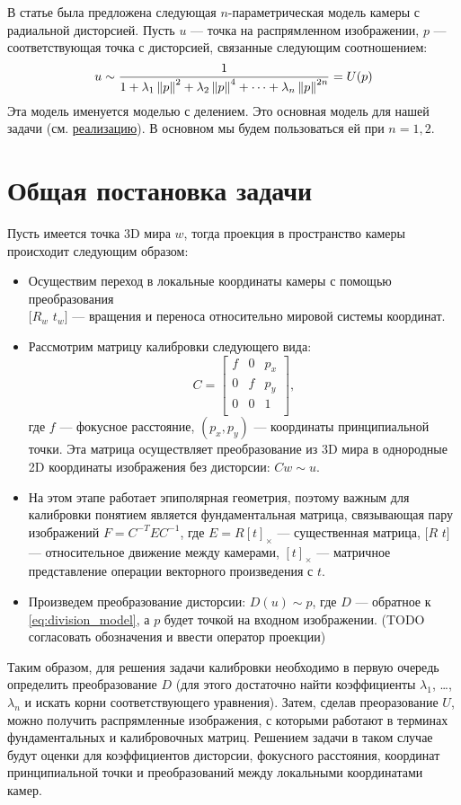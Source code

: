 \label{model}
В статье \cite{Fitzgibbon01b} была предложена следующая $n$-параметрическая модель камеры с радиальной дисторсией. Пусть $u$ --- точка на распрямленном изображении, $p$ --- соответствующая точка с дисторсией, связанные следующим соотношением:
\begin{equation}
	u \sim \frac{1}{1 + \lambda_1\left\lVert p\right\rVert^2 + \lambda_2\left\lVert p\right\rVert^4 + \cdots + \lambda_n\left\lVert p\right\rVert^{2n}} = U(p) \label{eq:division_model}
\end{equation} 
Эта модель именуется моделью с делением. Это основная модель для нашей задачи (см. \href{https://github.com/QuantumMechanicus/camera_calibration/blob/dev/core/scene/Intrinsics.h}{реализацию}). В основном мы будем пользоваться ей при $n = 1, 2$.

\section{Общая постановка задачи}
Пусть имеется точка 3D мира $w$, тогда проекция в пространство камеры происходит следующим образом:
\begin{itemize}
	\item Осуществим переход в локальные координаты камеры с помощью преобразования \\$[R_w$ $t_w]$ --- вращения и переноса относительно мировой системы координат.
	\item Рассмотрим матрицу калибровки следующего вида: 
	\begin{equation}
		C = \begin{bmatrix}
		f & 0 & p_x \\
		0 & f & p_y \\
		0 & 0 & 1 \\
		\end{bmatrix}, 
	\end{equation}
	где $f$ --- фокусное расстояние,  $\left(p_x, p_y\right)$ --- координаты принципиальной точки. Эта матрица осуществляет преобразование из 3D мира в однородные 2D координаты изображения без дисторсии: $Cw \sim u$. 
	\item На этом этапе работает эпиполярная геометрия, поэтому важным для калибровки понятием является фундаментальная матрица, связывающая пару изображений $F = C^{-T}EC^{-1}$, где $E = R [t]_{\times}$ --- существенная матрица, $[R$ $t]$ ---  относительное движение между камерами, $[t]_{\times}$ --- матричное представление операции векторного произведения с $t$.   
	\item Произведем преобразование дисторсии: $D(u) \sim p$, где $D$ --- обратное к \eqref{eq:division_model}, а $p$ будет точкой на входном изображении. (TODO согласовать обозначения и ввести оператор проекции)
\end{itemize} 
Таким образом, для решения задачи калибровки необходимо в первую очередь определить преобразование $D$ (для этого достаточно найти коэффициенты $\lambda_1$, \dots, $\lambda_n$ и искать корни соответствующего уравнения). Затем, сделав преоразование $U$, можно получить распрямленные изображения, с которыми работают в терминах фундаментальных и калибровочных матриц. Решением задачи в таком случае будут оценки для коэффициентов дисторсии, фокусного расстояния, координат принципиальной точки и преобразований между локальными координатами камер.
